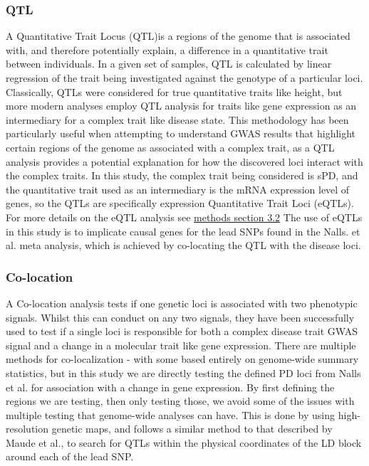 \documentclass{article}
\begin{document}
\subsubsection{QTL}
\label{subsubsec:QTL}
A Quantitative Trait Locus (QTL)is a regions of the genome that is associated with, and therefore potentially explain, a difference in a quantitative trait between individuals. In a given set of samples, QTL is calculated by linear regression of the trait being investigated against the genotype of a particular loci\cite{Duffy2017AnalysisLoci}. Classically, QTLs were considered for true quantitative traits like height, but more modern analyses employ QTL analysis for traits like gene expression as an intermediary for a complex trait like disease state. This methodology has been particularly useful when attempting to understand GWAS results that highlight certain regions of the genome as associated with a complex trait, as a QTL analysis provides a potential explanation for how the discovered loci interact with the complex traits\cite{Neumeyer2020StrengtheningLoci}. In this study, the complex trait being considered is sPD, and the quantitative trait used as an intermediary is the mRNA expression level of genes, so the QTLs are specifically expression Quantitative Trait Loci (eQTLs). For more details on the eQTL analysis see \hyperref[subsec:eQTL]{methods section 3.2} The use of eQTLs in this study is to implicate causal genes for the lead SNPs found in the Nalls. et al.\cite{Nalls2019IdentificationStudies} meta analysis, which is achieved by co-locating the QTL with the disease loci.
\subsubsection{Co-location}
A Co-location analysis tests if one genetic loci is associated with two phenotypic signals\cite{Giambartolomei2014BayesianStatistics}. Whilst this can conduct on any two signals, they have been successfully used to test if a single loci is responsible for both a complex disease trait GWAS signal and a change in a molecular trait like gene expression\cite{Cano-Gamez2020FromDiseases}. There are multiple methods for co-localization - with some based entirely on genome-wide summary statistics, but in this study we are directly testing the defined PD loci from Nalls et al.\cite{Nalls2019IdentificationStudies} for association with a change in gene expression. By first defining the regions we are testing, then only testing those, we avoid some of the issues with multiple testing that genome-wide analyses can have. This is done by using high-resolution genetic maps\cite{Maniatis2004PositionalDisequilibrium.}, and follows a similar method to that described by Maude et al.\cite{Maude2021NewDiabetes.}, to search for QTLs within the physical coordinates of the LD block around each of the lead SNP.
\end{document}
